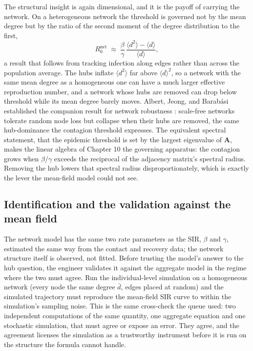 The structural insight is again dimensional, and it is the payoff of
carrying the network. On a heterogeneous network the threshold is governed
not by the mean degree but by the ratio of the second moment of the degree
distribution to the first,
\[
R_0^{\text{net}} \;\approx\; \frac{\beta}{\gamma}\,
  \frac{\langle d^2\rangle - \langle d\rangle}{\langle d\rangle},
\]
a result that follows from tracking infection along edges rather than
across the population average. The hubs inflate $\langle d^2\rangle$ far
above $\langle d\rangle^2$, so a network with the same mean degree as a
homogeneous one can have a much larger effective reproduction number, and a
network whose hubs are removed can drop below threshold while its mean
degree barely moves. Albert, Jeong, and Barab{\'a}si established the
companion result for network robustness
\cite{paper:v6c08-albert-barabasi-2000}: scale-free networks tolerate
random node loss but collapse when their hubs are removed, the same
hub-dominance the contagion threshold expresses. The equivalent spectral
statement, that the epidemic threshold is set by the largest eigenvalue of
$\mathbf{A}$, makes the linear algebra of Chapter 10 the governing
apparatus: the contagion grows when $\beta/\gamma$ exceeds the reciprocal
of the adjacency matrix's spectral radius. Removing the hub lowers that
spectral radius disproportionately, which is exactly the lever the
mean-field model could not see.



\subsection{Identification and the validation against the mean field}

The network model has the same two rate parameters as the SIR, $\beta$ and
$\gamma$, estimated the same way from the contact and recovery data; the
network structure itself is observed, not fitted. Before trusting the
model's answer to the hub question, the engineer validates it against the
aggregate model in the regime where the two must agree. Run the
individual-level simulation on a homogeneous network (every node the same
degree $\bar{d}$, edges placed at random) and the simulated trajectory must
reproduce the mean-field SIR curve to within the simulation's sampling
noise. This is the same cross-check the queue used: two independent
computations of the same quantity, one aggregate equation and one
stochastic simulation, that must agree or expose an error. They agree, and
the agreement licenses the simulation as a trustworthy instrument before it
is run on the structure the formula cannot handle.

